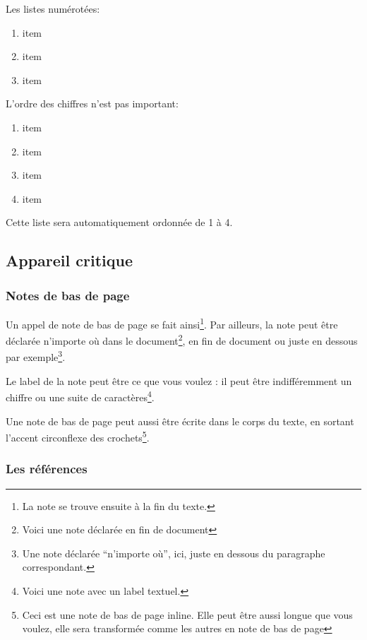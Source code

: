 \documentclass[12pt,french,letterpaper]{article}
\providecommand{\tightlist}{%
  \setlength{\itemsep}{0pt}\setlength{\parskip}{0pt}}
\begin{document}
Les listes numérotées:

\begin{enumerate}
\def\labelenumi{\arabic{enumi}.}
\tightlist
\item
  item
\item
  item
\item
  item
\end{enumerate}

L'ordre des chiffres n'est pas important:

\begin{enumerate}
\def\labelenumi{\arabic{enumi}.}
\tightlist
\item
  item
\item
  item
\item
  item
\item
  item
\end{enumerate}

Cette liste sera automatiquement ordonnée de 1 à 4.

\hypertarget{appareil-critique}{%
\subsection{Appareil critique}\label{appareil-critique}}

\hypertarget{notes-de-bas-de-page}{%
\subsubsection{Notes de bas de page}\label{notes-de-bas-de-page}}

Un appel de note de bas de page se fait ainsi\footnote{La note se trouve
  ensuite à la fin du texte.}. Par ailleurs, la note peut être déclarée
n'importe où dans le document\footnote{Voici une note déclarée en fin de
  document}, en fin de document ou juste en dessous par
exemple\footnote{Une note déclarée ``n'importe où'', ici, juste en
  dessous du paragraphe correspondant.}.

Le label de la note peut être ce que vous voulez : il peut être
indifféremment un chiffre ou une suite de caractères\footnote{Voici une
  note avec un label textuel.}.

Une note de bas de page peut aussi être écrite dans le corps du texte,
en sortant l'accent circonflexe des crochets\footnote{Ceci est une note
  de bas de page inline. Elle peut être aussi longue que vous voulez,
  elle sera transformée comme les autres en note de bas de page}.

\hypertarget{les-ruxe9fuxe9rences}{%
\subsubsection{Les références}\label{les-ruxe9fuxe9rences}}
\end{document}
